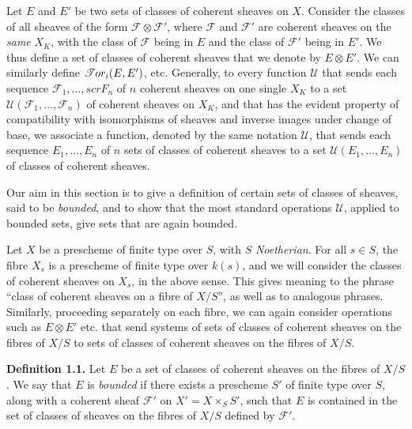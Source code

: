 \documentclass{article}
\newenvironment{rmenv}[1]
  {\phantomsection\par\smallskip\noindent\textbf{#1.}\rmfamily}
  {\par\smallskip}
\newcommand{\oldpage}[1]{\marginpar{\footnotesize$\Big\vert$ \textit{p.~#1}}}
\theoremstyle{definition}
\theoremstyle{definition}
\theoremstyle{definition}
\theoremstyle{definition}
\theoremstyle{remark}
\begin{document}
Let \(E\) and \(E'\) be two sets of classes of coherent sheaves on \(X\).
Consider the classes of all sheaves of the form \({\mathscr{F}}\otimes{\mathscr{F}}'\), where \({\mathscr{F}}\) and \({\mathscr{F}}'\) are coherent sheaves on the \emph{same} \(X_K\), with the class of \({\mathscr{F}}\) being in \(E\) and the class of \({\mathscr{F}}'\) being in \(E'\).
We thus define a set of classes of coherent sheaves that we denote by \(E\otimes E'\).
We can similarly define \(\mathscr{T}\kern -.5pt or_i(E,E')\), etc.
Generally, to every function \({\mathscr{U}}\) that sends each sequence \({\mathscr{F}}_1,\ldots,scr{F}_n\) of \(n\) coherent sheaves on one single \(X_K\) to a set \({\mathscr{U}}({\mathscr{F}}_1,\ldots,{\mathscr{F}}_n)\) of coherent sheaves on \(X_K\), and that has the evident property of compatibility with isomorphisms of sheaves and inverse images under change of base, we associate a function, denoted by the same notation \({\mathscr{U}}\), that sends each sequence \(E_1,\ldots,E_n\) of \(n\) sets of classes of coherent sheaves to a set \({\mathscr{U}}(E_1,\ldots,E_n)\) of classes of coherent sheaves.

Our aim in this section is to give a definition of certain sets of classes of sheaves, said to be \emph{bounded}, and to show that the most standard operations \({\mathscr{U}}\), applied to bounded sets, give sets that are again bounded.

Let \(X\) be a prescheme of finite type over \(S\), with \(S\) \emph{Noetherian}.
For all \(s\in S\), the fibre \(X_s\) is a prescheme of finite type over \(k(s)\), and we will consider the classes of coherent sheaves on \(X_s\), in the above sense.
This gives meaning to the phrase ``class of coherent sheaves on a fibre of \(X/S\)'', as well as to analogous phrases.
Similarly, proceeding separately on each fibre, we can again consider operations such as \(E\otimes E'\) etc. that send systems of sets of classes of coherent sheaves on the fibres of \(X/S\) to sets of classes of coherent sheaves on the fibres of \(X/S\).

\leavevmode{}%
\begin{rmenv}{Definition 1.1}
\oldpage{221-03}Let \(E\) be a set of classes of coherent sheaves on the fibres of \(X/S\).
We say that \(E\) is \emph{bounded} if there exists a prescheme \(S'\) of finite type over \(S\), along with a coherent sheaf \({\mathscr{F}}'\) on \(X'=X\times_S S'\), such that \(E\) is contained in the set of classes of sheaves on the fibres of \(X/S\) defined by \({\mathscr{F}}'\).

\end{rmenv}
\end{document}
